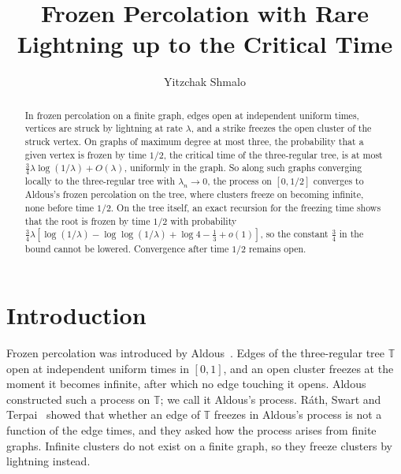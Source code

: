 \documentclass[11pt]{amsart}
\theoremstyle{remark}
\numberwithin{equation}{section}
\newcommand{\T}{\mathbb{T}}
\begin{document}
\title[Rare lightning up to the critical time]{Frozen Percolation with Rare Lightning up to the Critical Time}
\author{Yitzchak Shmalo}
\address{Einstein Institute of Mathematics, The Hebrew University of Jerusalem, Jerusalem, Israel}
\date{}

\begin{abstract}
In frozen percolation on a finite graph, edges open at independent
uniform times, vertices are struck by lightning at rate $\lambda$, and a
strike freezes the open cluster of the struck vertex. On graphs of
maximum degree at most three, the probability that a given vertex is
frozen by time $1/2$, the critical time of the three-regular tree, is at
most
$\frac34\lambda\log(1/\lambda)+O(\lambda)$, uniformly in the graph. So
along such graphs converging locally to the three-regular tree with
$\lambda_n\to0$, the process on $[0,1/2]$ converges to Aldous's frozen
percolation on the tree, where clusters freeze on becoming infinite,
none before time $1/2$. On the tree itself, an exact recursion for the
freezing time shows that the root is frozen by time $1/2$ with
probability
$\frac34\lambda[\log(1/\lambda)-\log\log(1/\lambda)+\log4-\frac13+o(1)]$,
so the constant $\frac34$ in the bound cannot be lowered. Convergence after time $1/2$ remains
open.
\end{abstract}

\maketitle

\section{Introduction}

Frozen percolation was introduced by Aldous~\cite{Ald00}. Edges of the
three-regular tree $\T$ open at independent uniform times in $[0,1]$, and
an open cluster freezes at the moment it becomes infinite, after which no
edge touching it opens. Aldous constructed such a process on $\T$; we
call it Aldous's process. Ráth, Swart and Terpai~\cite{RST21} showed
that whether an edge of $\T$ freezes in Aldous's process is not a
function of the edge times, and they asked how the process arises from
finite graphs. Infinite clusters do not exist on a finite graph, so they freeze
clusters by lightning instead.
\end{document}
